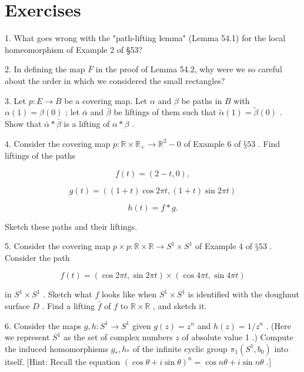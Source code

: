 \section*{Exercises}

1. What goes wrong with the "path-lifting lemma" (Lemma 54.1) for the local homeomorphism of Example 2 of §53?

2. In defining the map \(\bar{F}\) in the proof of Lemma 54.2, why were we so careful about the order in which we considered the small rectangles?

3. Let \(p : E \rightarrow  B\) be a covering map. Let \(\alpha\) and \(\beta\) be paths in \(B\) with \(\alpha \left( 1\right)  = \beta \left( 0\right)\) ; let \(\bar{\alpha }\) and \(\bar{\beta }\) be liftings of them such that \(\widetilde{\alpha }\left( 1\right)  = \widetilde{\beta }\left( 0\right)\) . Show that \(\bar{\alpha } * \bar{\beta }\) is a lifting of \(\alpha  * \beta\) .

4. Consider the covering map \(p : \mathbb{R} \times  {\mathbb{R}}_{ + } \rightarrow  {\mathbb{R}}^{2} - 0\) of Example 6 of \(§{53}\) . Find liftings of the paths

\[
f\left( t\right)  = \left( {2 - t,0}\right) ,
\]

\[
g\left( t\right)  = \left( {\left( {1 + t}\right) \cos {2\pi t},\left( {1 + t}\right) \sin {2\pi t}}\right)
\]

\[
h\left( t\right)  = f * g.
\]

Sketch these paths and their liftings.

5. Consider the covering map \(p \times  p : \mathbb{R} \times  \mathbb{R} \rightarrow  {S}^{1} \times  {S}^{1}\) of Example 4 of \(§{53}\) . Consider the path

\[
f\left( t\right)  = \left( {\cos {2\pi t},\sin {2\pi t}}\right)  \times  \left( {\cos {4\pi t},\sin {4\pi t}}\right)
\]

in \({S}^{1} \times  {S}^{1}\) . Sketch what \(f\) looks like when \({S}^{1} \times  {S}^{1}\) is identified with the doughnut surface \(D\) . Find a lifting \(\bar{f}\) of \(f\) to \(\mathbb{R} \times  \mathbb{R}\) , and sketch it.

6. Consider the maps \(g,h : {S}^{1} \rightarrow  {S}^{1}\) given \(g\left( z\right)  = {z}^{n}\) and \(h\left( z\right)  = 1/{z}^{n}\) . (Here we represent \({S}^{1}\) as the set of complex numbers \(z\) of absolute value 1 .) Compute the induced homomorphisms \({g}_{ * },{h}_{ * }\) of the infinite cyclic group \({\pi }_{1}\left( {{S}^{1},{b}_{0}}\right)\) into itself. [Hint: Recall the equation \({\left( \cos \theta  + i\sin \theta \right) }^{n} = \cos {n\theta } + i\sin {n\theta }\) .]

